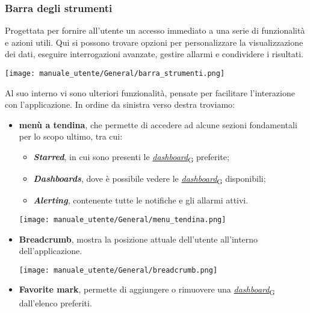 \subsubsection{Barra degli strumenti}
Progettata per fornire all'utente un accesso immediato a una serie di funzionalità e azioni utili. Qui si possono trovare opzioni per personalizzare la visualizzazione dei dati, eseguire interrogazioni avanzate, gestire allarmi e condividere i risultati.
\begin{center}
    \texttt{[image: manuale\_utente/General/barra\_strumenti.png]}
\end{center}
Al suo interno vi sono ulteriori funzionalità, pensate per facilitare l'interazione con l'applicazione. In ordine da sinistra verso destra troviamo:
\begin{itemize}
    \item \textbf{menù a tendina}, che permette di accedere ad alcune sezioni fondamentali per lo scopo ultimo, tra cui:
        \begin{itemize}
            \item \textbf{\textit{Starred}}, in cui sono presenti le \href{https://7last.github.io/docs/pb/documentazione-interna/glossario\#dashboard}{\textit{dashboard}\textsubscript{G}} preferite;
            \item \textbf{\textit{Dashboards}}, dove è possibile vedere le \href{https://7last.github.io/docs/pb/documentazione-interna/glossario\#dashboard}{\textit{dashboard}\textsubscript{G}} disponibili;
            \item \textbf{\textit{Alerting}}, contenente tutte le notifiche e gli allarmi attivi.
        \end{itemize}
        \begin{center}
            \texttt{[image: manuale\_utente/General/menu\_tendina.png]}
        \end{center}
    \item \textbf{Breadcrumb}, mostra la posizione attuale dell'utente all'interno dell'applicazione.
        \begin{center}
            \texttt{[image: manuale\_utente/General/breadcrumb.png]}
        \end{center}
    \item \textbf{Favorite mark}, permette di aggiungere o rimuovere una \href{https://7last.github.io/docs/pb/documentazione-interna/glossario\#dashboard}{\textit{dashboard}\textsubscript{G}} dall'elenco preferiti.

\end{itemize}
